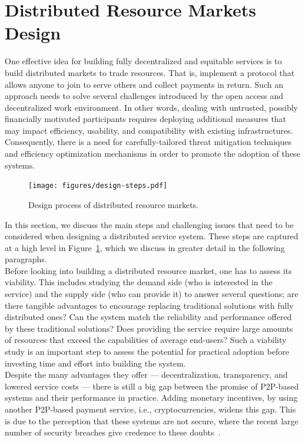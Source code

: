 \documentclass{llncs}
\begin{document}
\section{Distributed Resource Markets Design}
One effective idea for building fully decentralized and equitable services is to build distributed markets to trade resources. That is, implement a protocol that allows anyone to join to serve others and collect payments in return. Such an approach needs to solve several challenges introduced by the open access and decentralized work environment. In other words, dealing with untrusted, possibly financially motivated participants requires deploying additional measures that may impact efficiency, usability, and compatibility with existing infrastructures. Consequently, there is a need for carefully-tailored threat mitigation techniques and efficiency optimization mechanisms in order to promote the adoption of these systems.


\begin{figure}[ht!]
\centerline{
\texttt{[image: figures/design-steps.pdf]}}
\caption{Design process of distributed resource markets.} \label{design-steps}
\vspace{-12pt}
\end{figure}


In this section, we discuss the main steps and challenging issues that need to be considered when designing a distributed service system. These steps are captured at a high level in Figure~\ref{design-steps}, which we discuss in greater detail in the following paragraphs. \\


 Before looking into building a distributed resource market, one has to assess its viability. This includes studying the demand side (who is interested in the service) and the supply side (who can provide it) to answer several questions; are there tangible advantages to encourage replacing traditional solutions with fully distributed ones? Can the system match the reliability and performance offered by these traditional solutions? Does providing the service require large amounts of resources that exceed the capabilities of average end-users? Such a viability study is an important step to assess the potential for practical adoption before investing time and effort into building the system. \\


 Despite the many advantages they offer — decentralization, transparency, and lowered service costs — there is still a big gap between the promise of P2P-based systems and their performance in practice. Adding monetary incentives, by using another P2P-based payment service, i.e., cryptocurrencies, widens this gap. This is due to the perception that these systems are not secure, where the recent large number of security breaches give credence to these doubts~\cite{benebit-scam,binance-hack,bitcoin-cash-hack,bitcoingold-double-spending,exchange-hack-b,bitfloor-hack,korea-exchange-hack,eth-hack,ico-hack-b,exchange-hack,enigma-hack,mine-hack}.
\end{document}
